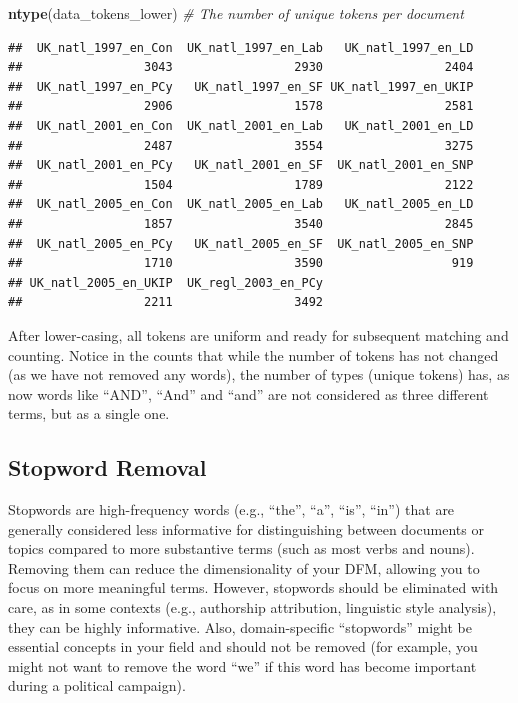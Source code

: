 \documentclass[
]{book}
\newenvironment{Shaded}{\begin{snugshade}}{\end{snugshade}}
\newcommand{\CommentTok}[1]{\textcolor[rgb]{0.56,0.35,0.01}{\textit{#1}}}
\newcommand{\FunctionTok}[1]{\textcolor[rgb]{0.13,0.29,0.53}{\textbf{#1}}}
\newcommand{\NormalTok}[1]{#1}
\begin{document}
\begin{Shaded}
\begin{Highlighting}[]
\FunctionTok{ntype}\NormalTok{(data\_tokens\_lower)  }\CommentTok{\# The number of unique tokens per document}
\end{Highlighting}
\end{Shaded}

\begin{verbatim}
##  UK_natl_1997_en_Con  UK_natl_1997_en_Lab   UK_natl_1997_en_LD 
##                 3043                 2930                 2404 
##  UK_natl_1997_en_PCy   UK_natl_1997_en_SF UK_natl_1997_en_UKIP 
##                 2906                 1578                 2581 
##  UK_natl_2001_en_Con  UK_natl_2001_en_Lab   UK_natl_2001_en_LD 
##                 2487                 3554                 3275 
##  UK_natl_2001_en_PCy   UK_natl_2001_en_SF  UK_natl_2001_en_SNP 
##                 1504                 1789                 2122 
##  UK_natl_2005_en_Con  UK_natl_2005_en_Lab   UK_natl_2005_en_LD 
##                 1857                 3540                 2845 
##  UK_natl_2005_en_PCy   UK_natl_2005_en_SF  UK_natl_2005_en_SNP 
##                 1710                 3590                  919 
## UK_natl_2005_en_UKIP  UK_regl_2003_en_PCy 
##                 2211                 3492
\end{verbatim}

After lower-casing, all tokens are uniform and ready for subsequent matching and counting. Notice in the counts that while the number of tokens has not changed (as we have not removed any words), the number of types (unique tokens) has, as now words like ``AND'', ``And'' and ``and'' are not considered as three different terms, but as a single one.

\subsection{Stopword Removal}\label{stopword-removal}

Stopwords are high-frequency words (e.g., ``the'', ``a'', ``is'', ``in'') that are generally considered less informative for distinguishing between documents or topics compared to more substantive terms (such as most verbs and nouns). Removing them can reduce the dimensionality of your DFM, allowing you to focus on more meaningful terms. However, stopwords should be eliminated with care, as in some contexts (e.g., authorship attribution, linguistic style analysis), they can be highly informative. Also, domain-specific ``stopwords'' might be essential concepts in your field and should not be removed (for example, you might not want to remove the word ``we'' if this word has become important during a political campaign).
\end{document}
